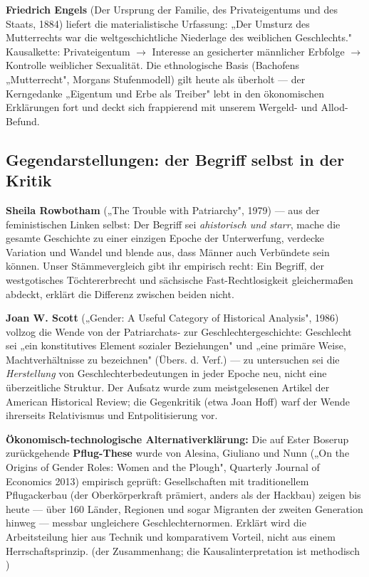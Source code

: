 \documentclass[11pt,a4paper,ngerman]{scrartcl}
\newcommand{\chipbase}[2]{\hspace{0pt}{\footnotesize\textcolor{#1}{[\textsc{#2}]}}}
\newcommand{\chipbelegt}[1]{\chipbase{chipgreen}{#1}}
\newcommand{\chipplausibel}[1]{\chipbase{chipamber}{#1}}
\newcommand{\chipumstritten}[1]{\chipbase{chipred}{#1}}
\begin{document}
\textbf{Friedrich Engels} (Der Ursprung der Familie, des Privateigentums und des Staats, 1884) liefert die materialistische Urfassung: „Der Umsturz des Mutterrechts war die weltgeschichtliche Niederlage des weiblichen Geschlechts." Kausalkette: Privateigentum \(\rightarrow\) Interesse an gesicherter männlicher Erbfolge \(\rightarrow\) Kontrolle weiblicher Sexualität. Die ethnologische Basis (Bachofens „Mutterrecht", Morgans Stufenmodell) gilt heute als überholt \chipumstritten{umstritten} — der Kerngedanke „Eigentum und Erbe als Treiber" lebt in den ökonomischen Erklärungen fort und deckt sich frappierend mit unserem Wergeld- und Allod-Befund. \chipplausibel{plausibel}

\subsection*{Gegendarstellungen: der Begriff selbst in der Kritik}

\textbf{Sheila Rowbotham} („The Trouble with Patriarchy", 1979) — aus der feministischen Linken selbst: Der Begriff sei \emph{ahistorisch und starr}, mache die gesamte Geschichte zu einer einzigen Epoche der Unterwerfung, verdecke Variation und Wandel und blende aus, dass Männer auch Verbündete sein können. \chipbelegt{belegt} Unser Stämmevergleich gibt ihr empirisch recht: Ein Begriff, der westgotisches Töchtererbrecht und sächsische Fast-Rechtlosigkeit gleichermaßen abdeckt, erklärt die Differenz zwischen beiden nicht.

\textbf{Joan W. Scott} („Gender: A Useful Category of Historical Analysis", 1986) vollzog die Wende von der Patriarchats- zur Geschlechtergeschichte: Geschlecht sei „ein konstitutives Element sozialer Beziehungen" und „eine primäre Weise, Machtverhältnisse zu bezeichnen" (Übers. d. Verf.) — zu untersuchen sei die \emph{Herstellung} von Geschlechterbedeutungen in jeder Epoche neu, nicht eine überzeitliche Struktur. Der Aufsatz wurde zum meistgelesenen Artikel der American Historical Review; die Gegenkritik (etwa Joan Hoff) warf der Wende ihrerseits Relativismus und Entpolitisierung vor. \chipbelegt{belegt}

\textbf{Ökonomisch-technologische Alternativerklärung:} Die auf Ester Boserup zurückgehende \textbf{Pflug-These} wurde von Alesina, Giuliano und Nunn („On the Origins of Gender Roles: Women and the Plough", Quarterly Journal of Economics 2013) empirisch geprüft: Gesellschaften mit traditionellem Pflugackerbau (der Oberkörperkraft prämiert, anders als der Hackbau) zeigen bis heute — über 160 Länder, Regionen und sogar Migranten der zweiten Generation hinweg — messbar ungleichere Geschlechternormen. Erklärt wird die Arbeitsteilung hier aus Technik und komparativem Vorteil, nicht aus einem Herrschaftsprinzip. \chipbelegt{belegt} (der Zusammenhang; die Kausalinterpretation ist methodisch \chipumstritten{umstritten})
\end{document}
